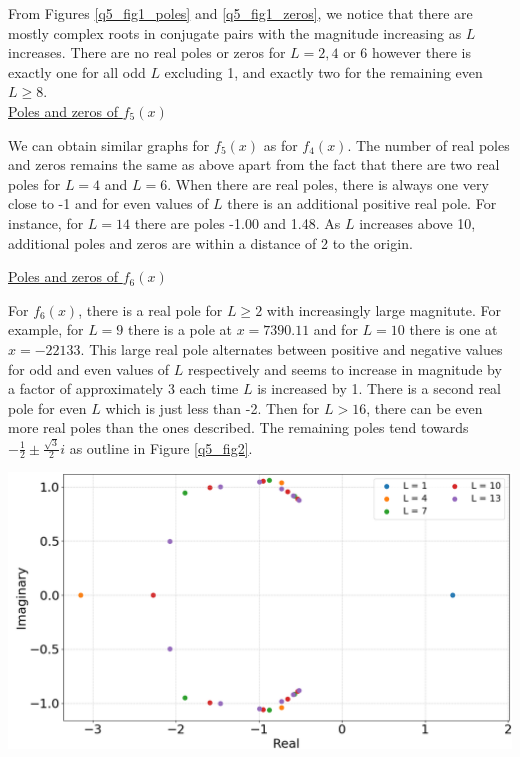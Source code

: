 \documentclass[12pt, a4paper]{article}
\begin{document}
From Figures \ref{q5_fig1_poles} and \ref{q5_fig1_zeros}, we notice that there are mostly complex roots
in conjugate pairs with the magnitude increasing as $L$ increases. There are no real poles or zeros for 
$L = 2, 4 \text{ or } 6$ however there is exactly one for all odd $L$ excluding 1, and exactly two for
the remaining even $L\geq 8$.
\\

\vspace{0.4cm}
\underline{Poles and zeros of $f_{5}(x)$}

\vspace{0.5cm}
We can obtain similar graphs for $f_{5}(x)$ as for $f_{4}(x)$. The number of real poles 
and zeros remains the same as above apart from the fact that there are two real poles 
for $L = 4$ and $L = 6$. When there are real poles, there is always one very close to 
-1 and for even values of $L$ there is an additional positive real pole. For instance, 
for $L = 14$ there are poles -1.00 and 1.48. As $L$ increases above 10, additional poles 
and zeros are within a distance of 2 to the origin.
\\
\newpage{}

\vspace{0.4cm}
\underline{Poles and zeros of $f_{6}(x)$}

\vspace{0.5cm}
For $f_{6}(x)$, there is a real pole for $L\geq 2 $ with increasingly large magnitute. For example, for 
$L = 9$ there is a pole at $x=7390.11$ and for $L=10$ there is one at $x=-22133$. This large real pole 
alternates between positive and negative values for odd and even values of $L$ respectively and seems
to increase in magnitude by a factor of approximately 3 each time $L$ is increased by 1. There is a 
second real pole for even $L$ which is just less than -2. Then for $L > 16$, there can be even more real
poles than the ones described. The remaining poles tend towards 
$-\frac{1}{2} \pm \frac{\sqrt{3}}{2}i$ as outline in Figure \ref{q5_fig2}.
\\

\begin{minipage}{\textwidth}
	\centering
	\includegraphics[width=0.9\linewidth]{q5_fig2_v2}

	\vspace*{-0.2cm}

	\label{q5_fig2}
\end{minipage}
\vspace{0.3cm}
\end{document}
